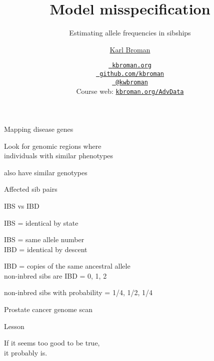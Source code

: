 \documentclass[aspectratio=169,12pt,t]{beamer}
\title{Model misspecification}
\subtitle{Estimating allele frequencies in sibships}
\author{\href{https://kbroman.org}{Karl Broman}}
\institute{Biostatistics \& Medical Informatics, UW{\textendash}Madison}
\date{\href{https://kbroman.org}{\tt \scriptsize \color{foreground} kbroman.org}
\\[-4pt]
\href{https://github.com/kbroman}{\tt \scriptsize \color{foreground} github.com/kbroman}
\\[-4pt]
\href{https://twitter.com/kwbroman}{\tt \scriptsize \color{foreground} @kwbroman}
\\[-4pt]
{\scriptsize Course web: \href{https://kbroman.org/AdvData}{\tt kbroman.org/AdvData}}
}
\begin{document}
{
\frame{
  \titlepage

  \note{}

} }


\begin{frame}[c]{Mapping disease genes}

  \centering
  \Large

  Look for genomic regions where \hspace*{20mm} \\[18pt]

  individuals with {\hilit similar phenotypes}

  also have {\hilit similar genotypes}

\end{frame}


\begin{frame}[c]{Affected sib pairs}
\end{frame}


\begin{frame}[c]{IBS vs IBD}


\large

IBS = identical by {\hilit state}

{\color{background} IBS}    = same allele number \\[18pt]

  IBD = identical by {\hilit descent}

{\color{background} IBD} = copies of the same ancestral allele \\[36pt]

non-inbred sibs are IBD = 0, 1, 2

{\color{background} non-inbred sibs} with probability = 1/4, 1/2, 1/4


\end{frame}

\begin{frame}[c]{Prostate cancer genome scan}
\end{frame}

\begin{frame}[c]{Lesson}

\centering
\Large
If it seems too good to be true, \\[12pt]
it probably is.

\end{frame}
\end{document}
